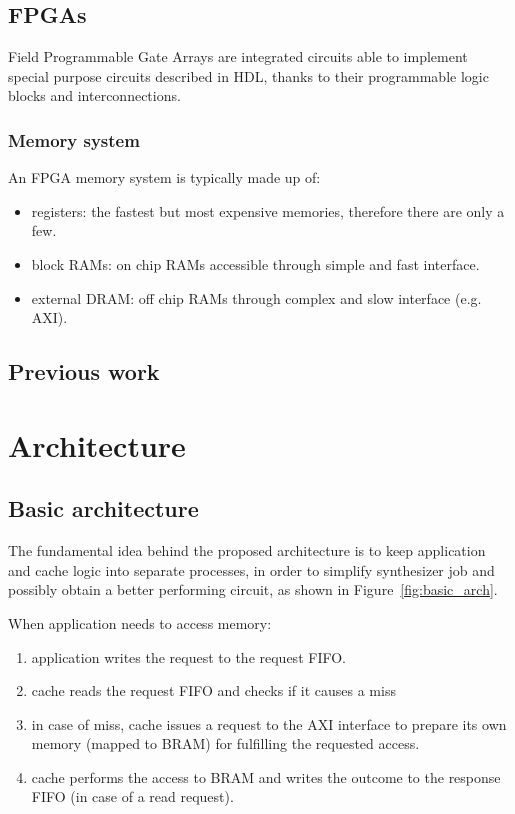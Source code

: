\documentclass[11pt,a4paper]{memoir}
\begin{document}
\section{FPGAs}
Field Programmable Gate Arrays are integrated circuits able to implement special
purpose circuits described in HDL, thanks to their programmable logic blocks and
interconnections.
\subsection{Memory system}
An FPGA memory system is typically made up of:
\begin{itemize}
	\item registers: the fastest but most expensive memories, therefore
		there are only a few.
	\item block RAMs: on chip RAMs accessible through simple and fast
		interface.
	\item external DRAM: off chip RAMs through complex and slow interface
		(e.g. AXI).
\end{itemize}

\section{Previous work}\label{sec:liang}

\chapter{Architecture}
\section{Basic architecture}
The fundamental idea behind the proposed architecture is to keep application and
cache logic into separate processes, in order to simplify synthesizer job and
possibly obtain a better performing circuit, as shown in Figure~\ref{fig:basic_arch}.

When application needs to access memory:
\begin{enumerate}
	\item application writes the request to the request FIFO.
	\item cache reads the request FIFO and checks if it causes a miss
	\item in case of miss, cache issues a request to the AXI interface to
		prepare its own memory (mapped to BRAM) for fulfilling the
		requested access.
	\item cache performs the access to BRAM and writes the outcome to the
		response FIFO (in case of a read request).
\end{enumerate}
\end{document}
